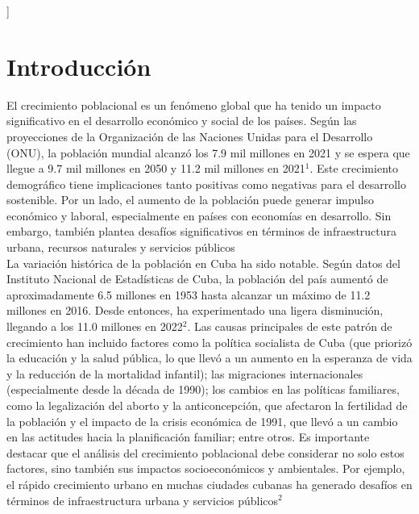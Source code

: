 \documentclass[a4paper,10pt,twocolumn]{article}
\begin{document}
\vspace{0.8cm}
]



\section{Introducción}\label{sec:intro}
El crecimiento poblacional es un fenómeno global que ha tenido un impacto significativo en el desarrollo económico y social de los países. Según las proyecciones de la Organización de las Naciones Unidas para el Desarrollo (ONU), la población mundial alcanzó los 7.9 mil millones en 2021 y se espera que llegue a 9.7 mil millones en 2050 y 11.2 mil millones en 2021$^{1}$. Este crecimiento demográfico tiene implicaciones tanto positivas como negativas para el desarrollo sostenible. Por un lado, el aumento de la población puede generar impulso económico y laboral, especialmente en países con economías en desarrollo. Sin embargo, también plantea desafíos significativos en términos de infraestructura urbana, recursos naturales y servicios públicos\\
La variación histórica de la población en Cuba ha sido notable. Según datos del Instituto Nacional de Estadísticas de Cuba, la población del país aumentó de aproximadamente 6.5 millones en 1953 hasta alcanzar un máximo de 11.2 millones en 2016. Desde entonces, ha experimentado una ligera disminución, llegando a los 11.0 millones en 2022$^{2}$. Las causas principales de este patrón de crecimiento han incluido factores como la política socialista de Cuba (que priorizó la educación y la salud pública, lo que llevó a un aumento en la esperanza de vida y la reducción de la mortalidad infantil); las migraciones internacionales (especialmente desde la década de 1990); los cambios en las políticas familiares, como la legalización del aborto y la anticoncepción, que afectaron la fertilidad de la población y el impacto de la crisis económica de 1991, que llevó a un cambio en las actitudes hacia la planificación familiar; entre otros. Es importante destacar que el análisis del crecimiento poblacional debe considerar no solo estos factores, sino también sus impactos socioeconómicos y ambientales. Por ejemplo, el rápido crecimiento urbano en muchas ciudades cubanas ha generado desafíos en términos de infraestructura urbana y servicios públicos$^{2}$\\
\end{document}
